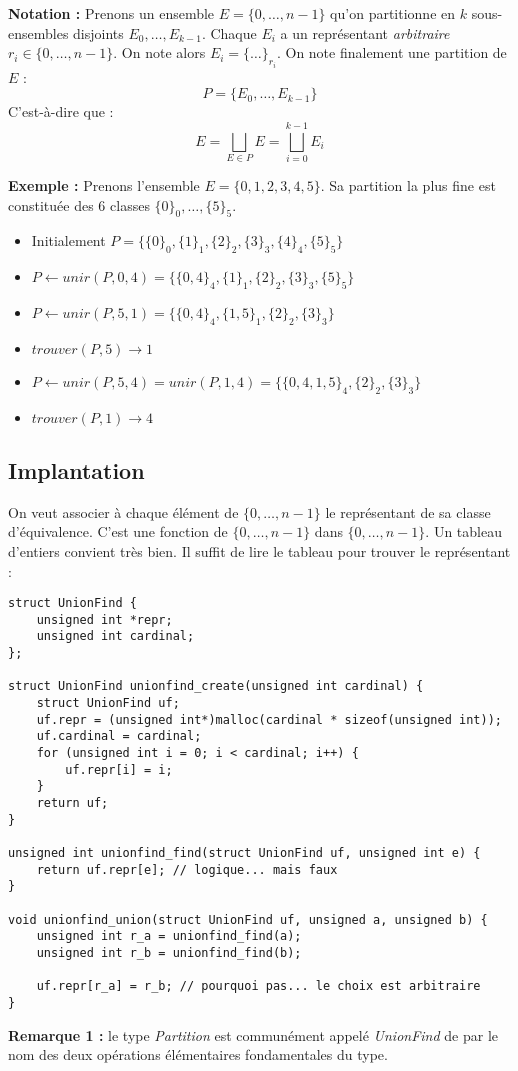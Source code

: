 \documentclass[../../../main.tex]{subfiles}
\begin{document}
\textbf{Notation :} Prenons un ensemble $E = \{0, \dots, n-1\}$ qu'on partitionne en $k$ sous-ensembles disjoints $E_0, \dots, E_{k-1}$. Chaque $E_i$ a un représentant \textit{arbitraire} $r_i\in \{0, \dots, n-1\}$. On note alors $E_i = \{\dots\}_{r_i}$.\newline
On note finalement une partition de $E$ :
$$P = \{E_0, \dots, E_{k-1}\}$$
C'est-à-dire que :
$$E = \displaystyle\bigsqcup_{E\in P}E = \displaystyle\bigsqcup_{i=0}^{k-1} E_i$$

\textbf{Exemple :} Prenons l'ensemble $E = \{0, 1, 2, 3, 4, 5\}$. Sa partition la plus fine est constituée des $6$ classes $\{0\}_0, \dots, \{5\}_5$.
\begin{itemize}
	\item Initialement $P = \{\{0\}_0, \{1\}_1, \{2\}_2, \{3\}_3, \{4\}_4, \{5\}_5\}$
	\item $P\leftarrow unir(P, 0, 4) = \{\{0, 4\}_4, \{1\}_1, \{2\}_2, \{3\}_3, \{5\}_5\}$
	\item $P\leftarrow unir(P, 5, 1) = \{\{0, 4\}_4, \{1, 5\}_1, \{2\}_2, \{3\}_3\}$
	\item $trouver(P, 5) \rightarrow 1$
	\item $P \leftarrow unir(P, 5, 4) = unir(P, 1, 4) = \{\{0, 4, 1, 5\}_4, \{2\}_2, \{3\}_3\}$
	\item $trouver(P, 1) \rightarrow 4$
\end{itemize}
\subsection{Implantation}
On veut associer à chaque élément de $\{0, \dots, n-1\}$ le représentant de sa classe d'équivalence. C'est une fonction de $\{0, \dots, n-1\}$ dans $\{0, \dots, n-1\}$. Un tableau d'entiers convient très bien. Il suffit de lire le tableau pour trouver le représentant :
\begin{verbatim}
struct UnionFind {
	unsigned int *repr;
	unsigned int cardinal;
};

struct UnionFind unionfind_create(unsigned int cardinal) {
	struct UnionFind uf;
	uf.repr = (unsigned int*)malloc(cardinal * sizeof(unsigned int));
	uf.cardinal = cardinal;
	for (unsigned int i = 0; i < cardinal; i++) {
		uf.repr[i] = i;
	}
	return uf;
}

unsigned int unionfind_find(struct UnionFind uf, unsigned int e) {
	return uf.repr[e]; // logique... mais faux
}

void unionfind_union(struct UnionFind uf, unsigned a, unsigned b) {
	unsigned int r_a = unionfind_find(a);
	unsigned int r_b = unionfind_find(b);

	uf.repr[r_a] = r_b; // pourquoi pas... le choix est arbitraire
}
\end{verbatim}
\textbf{Remarque 1 :} le type \textit{Partition} est communément appelé \textit{UnionFind} de par le nom des deux opérations élémentaires fondamentales du type.
\end{document}
